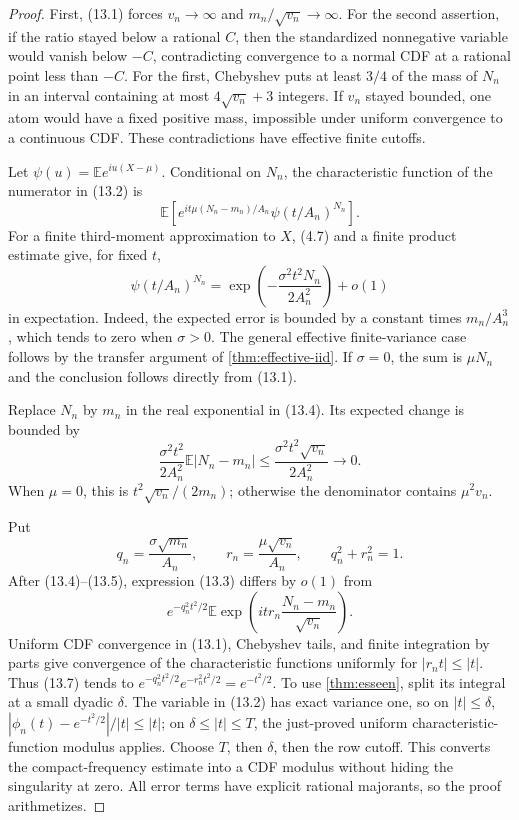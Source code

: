 \documentclass[11pt]{article}
\newcommand{\E}{\mathbb E}
\begin{document}
\begin{proof}
First, (13.1) forces \(v_n\to\infty\) and
\(m_n/\sqrt{v_n}\to\infty\).  For the second assertion, if the ratio stayed
below a rational \(C\), then the standardized nonnegative variable would
vanish below \(-C\), contradicting convergence to a normal CDF at a rational
point less than \(-C\).  For the first, Chebyshev puts at least \(3/4\) of
the mass of \(N_n\) in an interval containing at most
\(4\sqrt{v_n}+3\) integers.  If \(v_n\) stayed bounded, one atom would have a
fixed positive mass, impossible under uniform convergence to a continuous
CDF.  These contradictions have effective finite cutoffs.

Let \(\psi(u)=\E e^{iu(X-\mu)}\).  Conditional on \(N_n\), the
characteristic function of the numerator in (13.2) is
\[
 \E\left[
 e^{it\mu(N_n-m_n)/A_n}\psi(t/A_n)^{N_n}
 \right].                                             \tag{13.3}
\]
For a finite third-moment approximation to \(X\), (4.7) and a finite product
estimate give, for fixed \(t\),
\[
 \psi(t/A_n)^{N_n}
 =\exp\!\left(-\frac{\sigma^2t^2N_n}{2A_n^2}\right)+o(1)               \tag{13.4}
\]
in expectation.  Indeed, the expected error is bounded by a constant times
\(m_n/A_n^3\), which tends to zero when \(\sigma>0\).  The general effective
finite-variance case follows by the transfer argument of
\cref{thm:effective-iid}.  If \(\sigma=0\), the sum is \(\mu N_n\) and the
conclusion follows directly from (13.1).

Replace \(N_n\) by \(m_n\) in the real exponential in (13.4).  Its expected
change is bounded by
\[
 \frac{\sigma^2t^2}{2A_n^2}\E|N_n-m_n|
 \le\frac{\sigma^2t^2\sqrt{v_n}}{2A_n^2}\longrightarrow0.             \tag{13.5}
\]
When \(\mu=0\), this is \(t^2\sqrt{v_n}/(2m_n)\); otherwise the denominator
contains \(\mu^2v_n\).

Put
\[
 q_n=\frac{\sigma\sqrt{m_n}}{A_n},
 \qquad r_n=\frac{\mu\sqrt{v_n}}{A_n},
 \qquad q_n^2+r_n^2=1.                                \tag{13.6}
\]
After (13.4)--(13.5), expression (13.3) differs by \(o(1)\) from
\[
 e^{-q_n^2t^2/2}
 \E\exp\!\left(it r_n\frac{N_n-m_n}{\sqrt{v_n}}\right).               \tag{13.7}
\]
Uniform CDF convergence in (13.1), Chebyshev tails, and finite integration by
parts give convergence of the characteristic functions uniformly for
\(|r_n t|\le|t|\).  Thus (13.7) tends to
\(e^{-q_n^2t^2/2}e^{-r_n^2t^2/2}=e^{-t^2/2}\).
To use \cref{thm:esseen}, split its integral at a small dyadic \(\delta\).
The variable in (13.2) has exact variance one, so on \(|t|\le\delta\),
\(|\phi_n(t)-e^{-t^2/2}|/|t|\le |t|\); on
\(\delta\le|t|\le T\), the just-proved uniform characteristic-function
modulus applies.  Choose \(T\), then \(\delta\), then the row cutoff.  This
converts the compact-frequency estimate into a CDF modulus without hiding the
singularity at zero.  All error terms have explicit rational majorants, so
the proof arithmetizes.
\end{proof}
\end{document}
